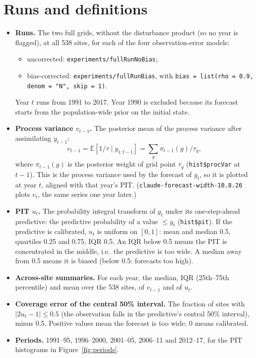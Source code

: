 \documentclass[11pt]{article}
\newcommand{\E}{\mathbb{E}}
\newcommand{\code}[1]{\texttt{#1}}
\begin{document}
\section{Runs and definitions}
\label{sec:defs}

\begin{itemize}
  \item \textbf{Runs.} The two full grids, without the disturbance product (so no year is
  flagged), at all 538 sites, for each of the four observation-error models:
  \begin{itemize}
    \item uncorrected: \code{experiments/fullRunNoBias};
    \item bias-corrected: \code{experiments/fullRunBias}, with
    \code{bias = list(rho = 0.9, denom = "N", skip = 1)}.
  \end{itemize}
  Year $t$ runs from 1991 to 2017. Year 1990 is excluded because its forecast starts
  from the population-wide prior on the initial state.
  \item \textbf{Process variance $v_{t-1}$.} The posterior mean of the process variance after assimilating
  $y_{t-1}$:
  \[
    v_{t-1} = \E[1/\tau \mid y_{1:t-1}] = \sum_g \pi_{t-1}(g)/\tau_g ,
  \]
  where $\pi_{t-1}(g)$ is the posterior weight of grid point $\tau_g$ (\code{hist\$procVar} at
  $t-1$). This is the process variance used by the forecast of $y_t$, so it is plotted at year
  $t$, aligned with that year's PIT. (\code{claude-forecast-width-10.8.26} plots $v_t$, the
  same series one year later.)
  \item \textbf{PIT $u_t$.} The probability integral transform of $y_t$ under its one-step-ahead
  predictive: the predictive probability of a value $\le y_t$ (\code{hist\$pit}). If
  the predictive is calibrated, $u_t$ is uniform on $[0,1]$: mean and median 0.5,
  quartiles 0.25 and 0.75, IQR 0.5. An IQR below 0.5 means the
  PIT is concentrated in the middle, i.e.\ the predictive is too wide. A median away from 0.5
  means it is biased (below 0.5: forecasts too high).
  \item \textbf{Across-site summaries.} For each year, the median, IQR (25th--75th
  percentile) and mean over the 538 sites, of $v_{t-1}$ and of $u_t$.
  \item \textbf{Coverage error of the central 50\% interval.} The fraction of sites with
  $|2u_t - 1| \le 0.5$ (the observation falls in the predictive's central 50\% interval),
  minus 0.5. Positive values mean the forecast is too wide; 0 means calibrated.
  \item \textbf{Periods.} 1991--95, 1996--2000, 2001--05, 2006--11 and 2012--17, for the PIT
  histograms in Figure~\ref{fig:periods}.
\end{itemize}
\end{document}
